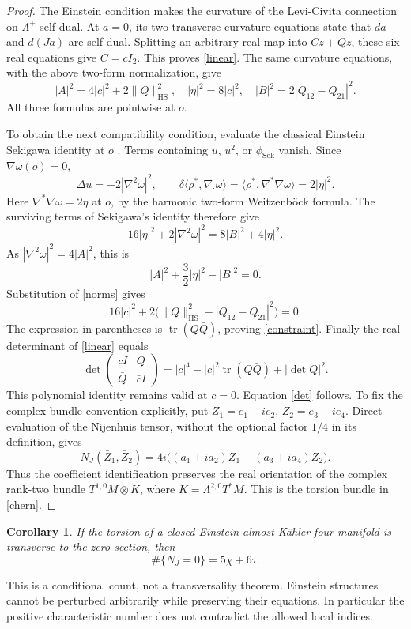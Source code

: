 \documentclass[11pt]{article}
\newtheorem{corollary}[proposition]{Corollary}
\newcommand{\tr}{\operatorname{tr}}
\begin{document}
\begin{proof}
The Einstein condition makes the curvature of the Levi-Civita connection on $\Lambda^+$ self-dual. At $a=0$, its two transverse curvature equations state that $da$ and $d(Ja)$ are self-dual. Splitting an arbitrary real map into $Cz+Q\bar z$, these six real equations give $C=cI_2$. This proves \eqref{linear}. The same curvature equations, with the above two-form normalization, give
\begin{equation}\label{norms}
|A|^2=4|c|^2+2\|Q\|_{\mathrm{HS}}^2,\quad
|\eta|^2=8|c|^2,\quad |B|^2=2|Q_{12}-Q_{21}|^2.
\end{equation}
All three formulas are pointwise at $o$.

To obtain the next compatibility condition, evaluate the classical Einstein Sekigawa identity at $o$ \cite[Proposition 2]{AD}. Terms containing $u$, $u^2$, or $\phi_{\mathrm{Sek}}$ vanish. Since $\nabla\omega(o)=0$,
\[
\Delta u=-2|\nabla^2\omega|^2,\qquad
\delta\langle\rho^*,\nabla_{\cdot}\omega\rangle
=\langle\rho^*,\nabla^*\nabla\omega\rangle=2|\eta|^2.
\]
Here $\nabla^*\nabla\omega=2\eta$ at $o$, by the harmonic two-form Weitzenb\"ock formula. The surviving terms of Sekigawa's identity therefore give
\[
16|\eta|^2+2|\nabla^2\omega|^2=8|B|^2+4|\eta|^2.
\]
As $|\nabla^2\omega|^2=4|A|^2$, this is
\begin{equation}\label{pointnorm}
|A|^2+\frac32|\eta|^2-|B|^2=0.
\end{equation}
Substitution of \eqref{norms} gives
\[
16|c|^2+2\bigl(\|Q\|_{\mathrm{HS}}^2-|Q_{12}-Q_{21}|^2\bigr)=0.
\]
The expression in parentheses is $\tr(Q\bar Q)$, proving \eqref{constraint}.
Finally the real determinant of \eqref{linear} equals
\[
\det\begin{pmatrix}cI&Q\\\bar Q&\bar cI\end{pmatrix}
=|c|^4-|c|^2\tr(Q\bar Q)+|\det Q|^2.
\]
This polynomial identity remains valid at $c=0$. Equation \eqref{det} follows. To fix the complex bundle convention explicitly, put $Z_1=e_1-ie_2$, $Z_2=e_3-ie_4$. Direct evaluation of the Nijenhuis tensor, without the optional factor $1/4$ in its definition, gives
\[
N_J(\bar Z_1,\bar Z_2)
=4i\bigl((a_1+ia_2)Z_1+(a_3+ia_4)Z_2\bigr).
\]
Thus the coefficient identification preserves the real orientation of the complex rank-two bundle $T^{1,0}M\otimes\bar K$, where $K=\Lambda^{2,0}T^*M$. This is the torsion bundle in \eqref{chern}.
\end{proof}

\begin{corollary}
If the torsion of a closed Einstein almost-K\"ahler four-manifold is transverse to the zero section, then
\[
\#\{N_J=0\}=5\chi+6\tau.
\]
\end{corollary}
This is a conditional count, not a transversality theorem. Einstein structures cannot be perturbed arbitrarily while preserving their equations. In particular the positive characteristic number does not contradict the allowed local indices.
\end{document}
